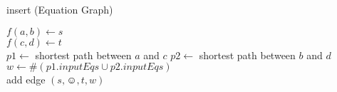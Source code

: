 \begin{algorithm}[h]
\caption[.]{insert (Equation Graph)}
	
	{
		$f(a,b) \leftarrow s$ \\
		$f(c,d) \leftarrow t$ \\
		$p1 \leftarrow $ shortest path between $a$ and $c$%
		$p2 \leftarrow $ shortest path between $b$ and $d$%
		$w \leftarrow \#(p1.inputEqs \cup p2.inputEqs) $ \\
		add edge $(s,\smiley,t,w)$ %
	}
  
  \label{algo:insert_dij}
\end{algorithm}
